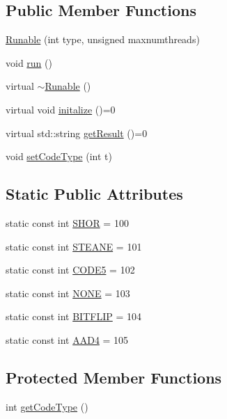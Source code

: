 \subsection*{Public Member Functions}
\begin{DoxyCompactItemize}
\item 
\hyperlink{class_runable_a5b603803388b888b078dcb0520082d15}{Runable} (int type, unsigned maxnumthreads)
\item 
void \hyperlink{class_runable_a766cbda482eeb5c181941f1a1113041c}{run} ()
\item 
virtual \hyperlink{class_runable_a6b1e67cab0fb137e26963f6e8d2687d4}{$\sim$\+Runable} ()
\item 
virtual void \hyperlink{class_runable_ae45ce89bb273ba5863e8ca0951caef85}{initalize} ()=0
\item 
virtual std\+::string \hyperlink{class_runable_a761a0c657253223f3dd7cf2c0762c34e}{get\+Result} ()=0
\item 
void \hyperlink{class_runable_a41f4c8d84fa427f05b82bb530d19e454}{set\+Code\+Type} (int t)
\end{DoxyCompactItemize}
\subsection*{Static Public Attributes}
\begin{DoxyCompactItemize}
\item 
static const int \hyperlink{class_runable_a27f57a3218c5237bdd5c0134db82e3f9}{S\+H\+OR} = 100
\item 
static const int \hyperlink{class_runable_a68af748dc3edebef5e1dd7a3e18a1b5f}{S\+T\+E\+A\+NE} = 101
\item 
static const int \hyperlink{class_runable_ad3dbc64c086f9e02f45c8e877f5ae898}{C\+O\+D\+E5} = 102
\item 
static const int \hyperlink{class_runable_a9dfae104f3c3623e9e39908c1560a7fe}{N\+O\+NE} = 103
\item 
static const int \hyperlink{class_runable_a56fc454699fbd4fcbe05bb90c36b80b0}{B\+I\+T\+F\+L\+IP} = 104
\item 
static const int \hyperlink{class_runable_a89b302b9a67e49ca32abd77560b58bdb}{A\+A\+D4} = 105
\end{DoxyCompactItemize}
\subsection*{Protected Member Functions}
\begin{DoxyCompactItemize}
\item 
int \hyperlink{class_runable_a9e9e55d77ae3cf5486fc60bae62f1141}{get\+Code\+Type} ()
\end{DoxyCompactItemize}
